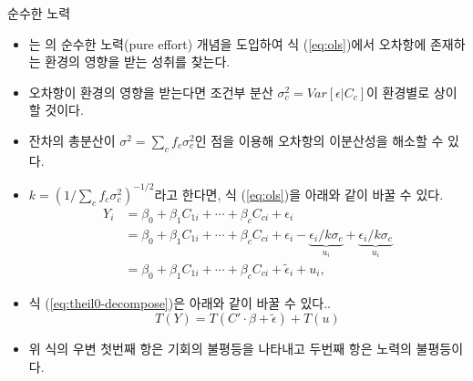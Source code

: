 \documentclass[handout, 10pt]{beamer}
\begin{document}
\begin{frame}{순수한 노력}
    \begin{itemize}
        \item \cite{betl12}는 \cite{Roemer98}의 순수한 노력(pure effort) 개념을 도입하여 식 (\ref{eq:ols})에서 오차항에 존재하는 환경의 영향을 받는 성취를 찾는다.
        \item 오차항이 환경의 영향을 받는다면 조건부 분산 $\sigma ^2 _c = Var[\epsilon |C_c]$이 환경별로 상이할 것이다.
        \item 잔차의 총분산이 $\sigma ^2 =  \sum _c f_c \sigma ^2 _c$인 점을 이용해 오차항의 이분산성을 해소할 수 있다.
    \end{itemize}
\end{frame}

\begin{frame}{\cite{betl12}}
    \begin{itemize}
        \item  $k = ( 1 / \sum _c f _c \sigma ^2 _c ) ^{-1/2}$라고 한다면, 식 (\ref{eq:ols})을 아래와 같이 바꿀 수 있다. 
        \begin{equation}
            \label{eq:bjork}
            \begin{aligned} Y_{i} &= \beta _0 +  \beta _1 C_{1i} + \cdots + \beta _c C_{ci} + \epsilon_{i} \\ &= \beta _0 +  \beta _1 C_{1i} + \cdots + \beta _c C_{ci} +\epsilon_{i}-\underbrace{\epsilon_{i} / k \sigma_{c}}_{u_{i}}+\underbrace{\epsilon_{i} / k \sigma_{c}}_{u_{i}} \\ &= \beta _0 +  \beta _1 C_{1i} + \cdots + \beta _c C_{ci} +\widetilde{\epsilon}_{i}+u_{i}, \end{aligned}
        \end{equation}
        \item 식 (\ref{eq:theil0-decompose})은 아래와 같이 바꿀 수 있다.. 
        \begin{equation}
            \label{eq:theil0-bjork}
            T(Y)=T(C' \cdot \beta +\widetilde{\epsilon}) + T ( u )
        \end{equation}
        \item 위 식의 우변 첫번째 항은 기회의 불평등을 나타내고 두번째 항은 노력의 불평등이다.
    \end{itemize}
\end{frame}
\end{document}
